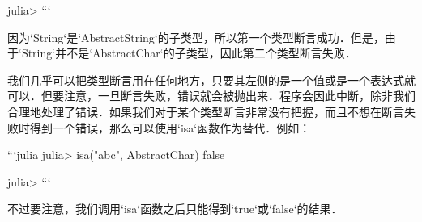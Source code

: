 julia> 
```

因为`String`是`AbstractString`的子类型，所以第一个类型断言成功．但是，由于`String`并不是`AbstractChar`的子类型，因此第二个类型断言失败．

我们几乎可以把类型断言用在任何地方，只要其左侧的是一个值或是一个表达式就可以．但要注意，一旦断言失败，错误就会被抛出来．程序会因此中断，除非我们合理地处理了错误．如果我们对于某个类型断言非常没有把握，而且不想在断言失败时得到一个错误，那么可以使用`isa`函数作为替代．例如：

```julia
julia> isa("abc", AbstractChar)
false

julia> 
```

不过要注意，我们调用`isa`函数之后只能得到`true`或`false`的结果．
